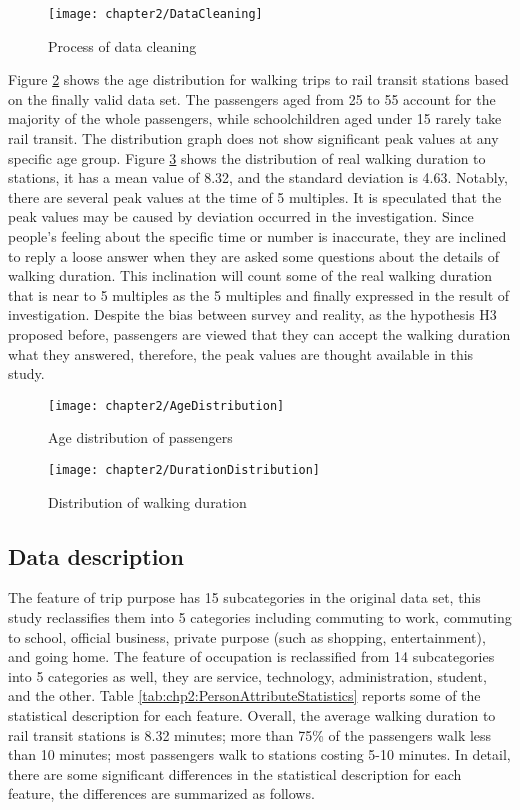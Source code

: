 \begin{figure}[htbp]
	\centering
	\texttt{[image: chapter2/DataCleaning]}
	\caption{Process of data cleaning}
	\label{fig:chp2:DataCleaning}
\end{figure}

%
Figure \ref{fig:chp2:AgeDistribution} shows the age distribution for walking trips to rail transit stations based on the finally valid data set. The passengers aged from 25 to 55 account for the majority of the whole passengers, while schoolchildren aged under 15 rarely take rail transit. The distribution graph does not show significant peak values at any specific age group. Figure \ref{fig:chp2:DurationDistribution} shows the distribution of real walking duration to stations, it has a mean value of 8.32, and the standard deviation is 4.63. Notably, there are several peak values at the time of 5 multiples. It is speculated that the peak values may be caused by deviation occurred in the investigation. Since people's feeling about the specific time or number is inaccurate, they are inclined to reply a loose answer when they are asked some questions about the details of walking duration. This inclination will count some of the real walking duration that is near to 5 multiples as the 5 multiples and finally expressed in the result of investigation. Despite the bias between survey and reality, as the hypothesis H3 proposed before, passengers are viewed that they can accept the walking duration what they answered, therefore, the peak values are thought available in this study.

\begin{figure}[htbp]
	\centering
	\texttt{[image: chapter2/AgeDistribution]}
	\caption{Age distribution of passengers}
	\label{fig:chp2:AgeDistribution}
\end{figure}

\begin{figure}[htbp]
	\centering
	\texttt{[image: chapter2/DurationDistribution]}
	\caption{Distribution of walking duration}
	\label{fig:chp2:DurationDistribution}
\end{figure}

%
\subsection{Data description}
The feature of trip purpose has 15 subcategories in the original data set, this study reclassifies them into 5 categories including commuting to work, commuting to school, official business, private purpose (such as shopping, entertainment), and going home. The feature of occupation is reclassified from 14 subcategories into 5 categories as well, they are service, technology, administration, student, and the other. Table \ref{tab:chp2:PersonAttributeStatistics} reports some of the statistical description for each feature. Overall, the average walking duration to rail transit stations is 8.32 minutes; more than 75\% of the passengers walk less than 10 minutes; most passengers walk to stations costing 5-10 minutes. In detail, there are some significant differences in the statistical description for each feature, the differences are summarized as follows.

